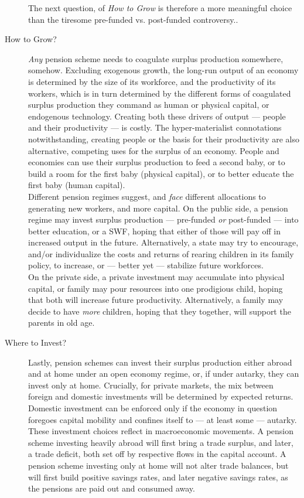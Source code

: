 \documentclass[11pt,a4paper,oneside,openright]{article}
\begin{document}
\begin{description}
{		The next question, of \emph{How to Grow} is therefore a more meaningful choice than the tiresome pre-funded vs. post-funded controversy.}.\\ 
	\item[How to Grow?] \emph{Any} pension scheme needs to coagulate surplus production somewhere, somehow. 
	Excluding exogenous growth, the long-run output of an economy is determined by the size of its workforce, and the productivity of its workers, which is in turn determined by the different forms of coagulated surplus production they command as human or physical capital, or endogenous technology. 
	Creating both these drivers of output --- people and their productivity --- is costly. 
	The hyper-materialist connotations notwithstanding, creating people or the basis for their productivity are also alternative, competing uses for the surplus of an economy. 
	People and economies can use their surplus production to feed a second baby, or to build a room for the first baby (physical capital), or to better educate the first baby (human capital). \\
	Different pension regimes suggest, and \emph{face} different allocations to generating new workers, and more capital. 
	On the public side, a pension regime may invest surplus production --- pre-funded \emph{or} post-funded --- into better education, or a \gls{SWF}, hoping that either of those will pay off in increased output in the future. 
	Alternatively, a state may try to encourage, and/or individualize the costs and returns of rearing children in its family policy, to increase, or --- better yet --- stabilize future workforces. \\
	On the private side, a private investment may accumulate into physical capital, or family may pour resources into one prodigious child, hoping that both will increase future productivity. 
	Alternatively, a family may decide to have \emph{more} children, hoping that they together, will support the parents in old age.
	
	\item[Where to Invest?] Lastly, pension schemes can invest their surplus production either abroad and at home under an open economy regime, or, if under autarky, they can invest only at home. 
	Crucially, for private markets, the mix between foreign and domestic investments will be determined by expected returns. 
	Domestic investment can be enforced only if the economy in question foregoes capital mobility and confines itself to --- at least some --- autarky. \\
	These investment choices reflect in macroeconomic movements. 
	A pension scheme investing heavily abroad will first bring a trade surplus, and later, a trade deficit, both set off by respective flows in the capital account. 
	A pension scheme investing only at home will not alter trade balances, but will first build positive savings rates, and later negative savings rates, as the pensions are paid out and consumed away.
\end{description}
\end{document}
